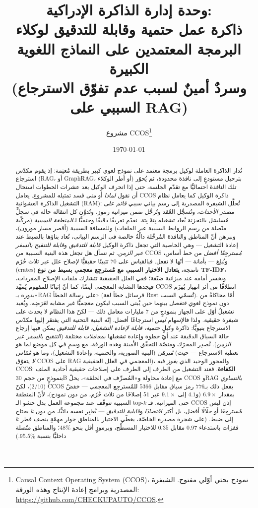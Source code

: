 \documentclass[11pt]{article}
\title{\textbf{وحدة إدارة الذاكرة الإدراكية:\\ ذاكرة عمل حتمية وقابلة للتدقيق لوكلاء البرمجة المعتمدين على النماذج اللغوية الكبيرة\\ \large (وسردٌ أمينٌ لسبب عدم تفوّق الاسترجاع السببي على RAG)}}
\author{مشروع CCOS\thanks{Causal Context Operating System (CCOS)، نموذج بحثي أوّلي
مفتوح. الشيفرة المصدرية وبرامج إعادة الإنتاج وهذه الورقة:
\url{https://github.com/CHECKUPAUTO/CCOS}.}}
\date{\today}
\begin{document}
\maketitle

\begin{abstract}
تُدار الذاكرة العاملة لوكيل برمجة معتمد على نموذج لغوي كبير بطريقة مُعتِمة: إذ يقوم
مكدّس استرجاع (RAG، أو GraphRAG، أو أطر الوكلاء) بترحيل مستودعٍ إلى نافذة محدودة، ثم
يُحوّر تلك النافذة احتماليًّا مع تقدّم الجلسة، حتى إذا انحرف الوكيل بعد عشرات الخطوات
استحال أن نقول \emph{لماذا} أو \emph{متى} فسد تمثيله للمشروع. يعامل CCOS ذاكرة الوكيل
كما يعامل نظام التشغيل الذاكرة العشوائية (RAM): تُحلَّل الشيفرة المصدرية إلى رسم بياني
سببي \emph{قائم على مصدر الأحداث}، وتُسجَّل العُقد وتُرحَّل ضمن ميزانية رموز، وتُدوَّن كل
انتقالة حالة في سجلٍّ مُسلسَل بالتجزئة يُعاد تشغيله بِتةً بِتة. نقدّم تعريفًا دقيقًا
وحتميًّا لـ\emph{المنطقة السببية} (مركّبة متّصلة من رسم الروابط السببية عبر الملفات)
وللمسافة السببية (أقصر مسار موزون)، ونبرهن أنّ المناطق والنافذة المُرحَّلة دالّةٌ خالصة
في الرسم البياني، تُعاد بناؤها بالضبط عند إعادة التشغيل --- وهي الخاصية التي تجعل ذاكرة
الوكيل \emph{قابلة للتدقيق} و\emph{قابلة للتنقيح بالسفر عبر الزمن}. ثم نسأل هل تجعل هذه
البنية السببية من CCOS \emph{مُسترجِعًا أفضل} من خط أساس، ونُبلِغ --- بأمانة --- أنّها لا
تفعل. فبالقياس على $70$ تثبيتًا حقيقيًّا لإصلاح علل عبر ثلاث حُزَم (crates) ناضجة،
\textbf{يتعادل الاختيار السببي مع مُسترجِع معجمي بسيط من نوع TF-IDF}، ويخسر أمامه عند
ميزانية ضيّقة؛ ففي العلل الحقيقية تتشارك ملفات الإصلاح المفردات، فيجدها التشابه المعجمي
أيضًا، كما أنّ إثباتًا للمفهوم يُمهِّد CCOS انطلاقًا من أثر انهيار يُهزَم بدوره بـ«RAG على
رسالة الخطأ» (فرسائل خطأ لغة Rust تُسمّي السبب). أمّا محاكاةٌ من دون نموذج لغوي
\emph{فتفصل} بينهما حين يُبنى السبب ليكون معجميًّا غير مشابه لعَرَضِه، ويُعيد تشغيلٌ أوّل
على الجهاز بنموذجٍ من $7$ مليارات معامل ذلك --- لكنّ هذا النظام لا يحدث على شيفرة حقيقية.
ولذا فالإسهام \emph{ليس} استرجاعًا أفضل. إنّه البنية التحتية التي يفتقر إليها مكدّس
الاسترجاع بنيويًّا: ذاكرة وكيلٍ \emph{حتمية، قابلة لإعادة التشغيل، قابلة للتدقيق} يمكن فيها
إرجاع حالة السياق الدقيقة عند أيّ خطوة وإعادة تشغيلها بمعاملات مختلفة (\emph{التنقيح بالسفر
عبر الزمن}). نُصدِر المحرّك ومنصّة التحقّق الأمينة وهذه الورقة، مع وسمٍ في كل موضع لما هو
\emph{مُبرهَن} (البنية الصورية، والحتمية، وإعادة التشغيل)، وما هو \emph{مُقاس} (تغطية
الاسترجاع --- حيث \emph{لا} يتفوّق CCOS على RAG المعجمي في العلل الحقيقية)، والمحور الوحيد
الذي \emph{يفوز} فيه CCOS: \textbf{الكفاءة}. فعند التشغيل من الطرف إلى الطرف على إصلاحات
حقيقية أحادية الملف بنموذجٍ من حجم 30B مع إعادة محاولة و«المُصرِّف في الحلقة»، يحلّ CCOS
وRAG \emph{بالتساوي} ($2/10$)، لكنّ CCOS يفعل ذلك بـ$776$ رمز سياق مقابل $5366$
للمُسترجِع المعجمي --- خفضٌ بمقدار $6.9\times$ (و$4.1$ إلى $9.1\times$ عبر $51$ إصلاحًا من
ثلاث حُزَم، من دون نموذج)، لأنّ المنطقة السببية تتوقّف عند مجموعة العمل بدل حشو
الـ top-$k$ حتى الميزانية. فـ CCOS إذن ليس مُسترجِعًا أو حلّالًا أفضل، بل أكثر
\emph{اقتصادًا} و\emph{قابلية للتدقيق} --- يُعايِر نفسه ذاتيًّا، من دون $k$ يحتاج إلى ضبط.
(على شجرة مصدره الخاصّة، يغطّي الاختيار بالمناطق جوار مهمّةٍ بنصف قطر $k$ قفزات باستدعاء
$0.97$ مقابل $0.35$ للاختيار المسطّح، وبرموزٍ أقل بنحو $48\%$؛ والمناطق متّصلة داخليًّا
بنسبة $95.5\%$.)
\end{abstract}
\end{document}
